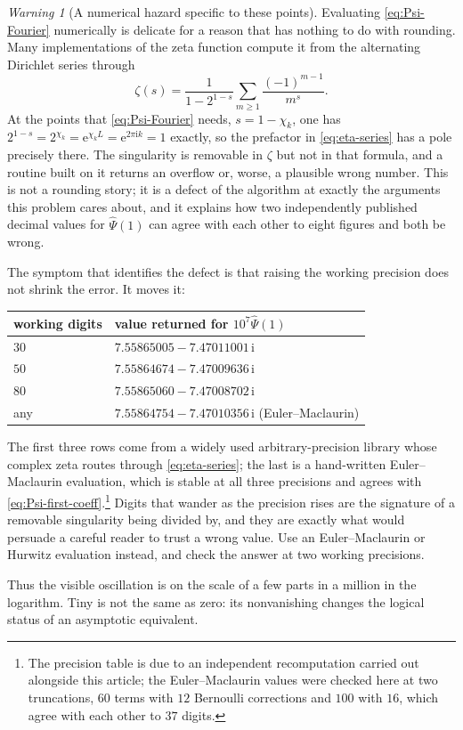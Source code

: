 \documentclass[11pt,oneside]{article}
\theoremstyle{definition}
\theoremstyle{remark}
\newtheorem{warning}[theorem]{Warning}
\newcommand{\e}{\mathrm e}
\newcommand{\ii}{\mathrm i}
\begin{document}
\begin{warning}[A numerical hazard specific to these points]
Evaluating \eqref{eq:Psi-Fourier} numerically is delicate for a reason that has nothing to do
with rounding.  Many implementations of the zeta function compute it from the alternating
Dirichlet series through
\begin{equation}
 \zeta(s)=\frac1{1-2^{1-s}}\sum_{m\ge1}\frac{(-1)^{m-1}}{m^{s}}.  \label{eq:eta-series}
\end{equation}
At the points that \eqref{eq:Psi-Fourier} needs, $s=1-\chi_k$, one has
$2^{1-s}=2^{\chi_k}=\e^{\chi_kL}=\e^{2\pi\ii k}=1$ exactly, so the prefactor in
\eqref{eq:eta-series} has a pole precisely there.  The singularity is removable in $\zeta$
but not in that formula, and a routine built on it returns an overflow or, worse, a plausible
wrong number.  This is not a rounding story; it is a defect of the algorithm at exactly the
arguments this problem cares about, and it explains how two independently published decimal
values for $\widehat\Psi(1)$ can agree with each other to eight figures and both be wrong.

The symptom that identifies the defect is that raising the working precision does not shrink
the error.  It moves it:
\begin{center}
\begin{tabular}{@{}ll@{}}
\toprule
working digits & value returned for $10^{7}\widehat\Psi(1)$\\
\midrule
$30$ & $7.55865005-7.47011001\,\ii$\\
$50$ & $7.55864674-7.47009636\,\ii$\\
$80$ & $7.55865060-7.47008702\,\ii$\\
\midrule
any & $7.55864754-7.47010356\,\ii$ \quad(Euler--Maclaurin)\\
\bottomrule
\end{tabular}
\end{center}
The first three rows come from a widely used arbitrary-precision library whose complex zeta
routes through \eqref{eq:eta-series}; the last is a hand-written Euler--Maclaurin evaluation,
which is stable at all three precisions and agrees with
\eqref{eq:Psi-first-coeff}.\footnote{The precision table is due to an independent
recomputation carried out alongside this article; the Euler--Maclaurin values were checked
here at two truncations, $60$ terms with $12$ Bernoulli corrections and $100$ with $16$,
which agree with each other to $37$ digits.}
Digits that wander as the precision rises are the signature of a removable singularity being
divided by, and they are exactly what would persuade a careful reader to trust a wrong value.
Use an Euler--Maclaurin or Hurwitz evaluation instead, and check the answer at two working
precisions.
\end{warning}  Thus the visible oscillation is
on the scale of a few parts in a million in the logarithm.  Tiny is not the same as zero: its
nonvanishing changes the logical status of an asymptotic equivalent.
\end{document}
